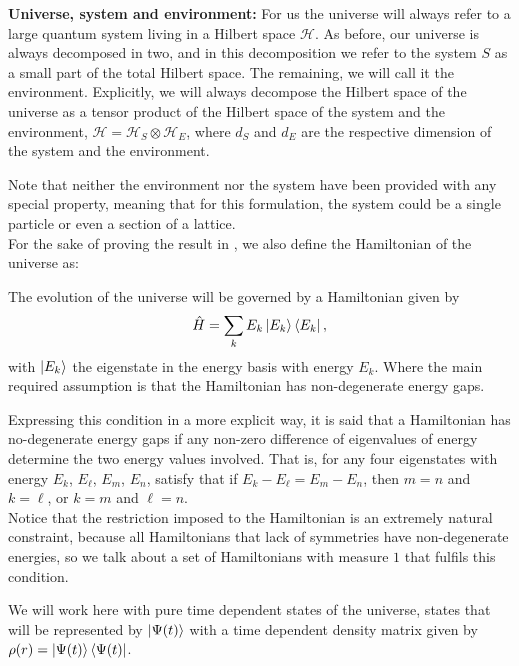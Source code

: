 \textbf{Universe, system and environment:} For us the universe will always refer to a large quantum system living in a Hilbert space $\mathcal{H}$. As before, our universe is always decomposed in two,  and in this decomposition we refer to the system $S$ as a small part of the total Hilbert space. The remaining, we will call it the environment. Explicitly, we will always decompose the Hilbert space of the universe as a tensor product of the Hilbert space of the system and the environment, $\mathcal{H}=\mathcal{H}_S\otimes \mathcal{H}_E$, where $d_S$ and $d_E$ are the respective dimension of the system and the environment. 

Note that neither the environment nor the system have been provided with any special property, meaning that for this formulation, the system could be a single particle or even a section of a lattice.\\
\indent For the sake of proving the result in \cite{linden_quantum_2009}, we also define the Hamiltonian of the universe as:
\begin{definition}[Hamiltonian]
The evolution of the universe will be governed by a Hamiltonian given by
\begin{equation}
\hat{H}=\sum_{k}E_k\mathinner{|{E_k}\rangle}\mathinner{\langle{E_k}|},
\label{CH1:Hamiltonian_universe_linden}
\end{equation}
with $\mathinner{|{E_k}\rangle}$ the eigenstate in the energy basis with energy $E_k$. Where the main required assumption is that the Hamiltonian has non-degenerate energy gaps.
\end{definition}
Expressing this condition in a more  explicit way, it is said that a Hamiltonian has no-degenerate energy gaps if any non-zero difference of eigenvalues of energy determine the two energy values involved. That is, for any four eigenstates with energy $E_k$, $E_\ell$, $E_m$, $E_n$, satisfy that if $E_{k}-E_{\ell}=E_{m}-E_{n}$, then $m=n$ and $k=\ell$, or $k=m$ and $\ell = n$. \\
\indent Notice that the restriction imposed to the Hamiltonian is an extremely natural constraint, because all Hamiltonians that lack of symmetries have non-degenerate energies, so we talk about a set of Hamiltonians with measure $1$ that fulfils this condition.\\
\begin{definition}[Notation:]
We will work here with pure time dependent states of the universe, states that will be represented by $\mathinner{|{\Psi(t)}\rangle}$ with a time dependent density matrix given by $\rho(r) =\mathinner{|{\Psi(t)}\rangle}\mathinner{\langle{\Psi(t)}|}$. 
\end{definition}
